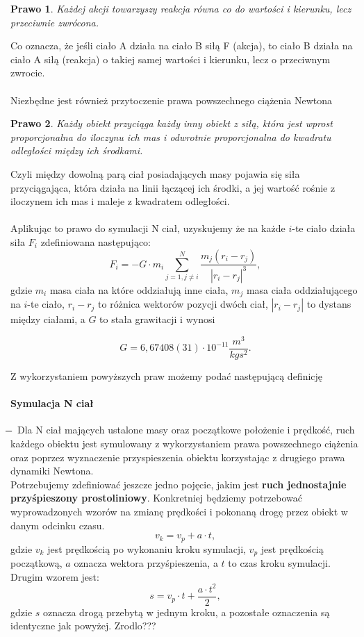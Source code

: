 \documentclass[14pt,twoside,a4paper]{article}
\newtheorem{theorem}{Prawo}
\begin{document}
\begin{theorem}
Każdej akcji towarzyszy reakcja równa co do wartości i kierunku, lecz przeciwnie zwrócona.
\end{theorem} 
Co oznacza, że jeśli ciało A działa na ciało B siłą F (akcja), to ciało B działa na ciało A siłą (reakcja) o takiej samej wartości i kierunku, lecz o przeciwnym zwrocie.\\~\\


Niezbędne jest również przytoczenie prawa powszechnego ciążenia Newtona \cite{fund}
\begin{theorem}
Każdy obiekt przyciąga każdy inny obiekt z siłą, która jest wprost proporcjonalna do iloczynu ich mas i odwrotnie proporcjonalna do kwadratu odległości między ich środkami.
\end{theorem}
Czyli między dowolną parą ciał posiadających masy pojawia się siła przyciągająca, która działa na linii łączącej ich środki, a jej wartość rośnie z iloczynem ich mas i maleje z kwadratem odległości.\\~\\

Aplikując to prawo do symulacji N ciał, uzyskujemy że na każde $i$-te ciało działa siła $F_i$ zdefiniowana następująco:\\
$$F_i = -G\cdot m_i \sum_{j=1, j\neq i}^N \frac{m_j(r_i - r_j)}{|r_i - r_j|^3},$$gdzie $m_i$ masa ciała na które oddziałują inne ciała, $m_j$ masa ciała oddziałującego na $i$-te ciało, $r_i - r_j$ to różnica wektorów pozycji dwóch ciał, $|r_i - r_j|$ to dystans między ciałami, a $G$ to stała grawitacji i wynosi
\begin{center}
$$G = 6,67408(31)\cdot 10^{-11} \frac{m^{3}}{kg s^2}.$$
\end{center}
Z wykorzystaniem powyższych praw możemy podać następującą definicję
\paragraph{Symulacja N ciał} 
\newcommand{\mi}{\boldsymbol{} \mathrel{\mkern -16mu} \boldsymbol{-}}
$\mi$
Dla N ciał mających ustalone masy oraz początkowe położenie i prędkość, ruch każdego obiektu jest symulowany z wykorzystaniem prawa powszechnego ciążenia oraz poprzez wyznaczenie przyspieszenia obiektu korzystając z drugiego prawa dynamiki Newtona.\\
\bigskip
Potrzebujemy zdefiniować jeszcze jedno pojęcie, jakim jest \textbf{ruch jednostajnie przyśpieszony prostoliniowy}.
Konkretniej będziemy potrzebować wyprowadzonych wzorów na zmianę prędkości i pokonaną drogę przez obiekt w danym odcinku czasu.
$$v_k = v_p + a\cdot t,$$ gdzie $v_k$ jest prędkością po wykonaniu kroku symulacji, $v_p$ jest prędkością początkową, $a$ oznacza wektora przyśpieszenia, a $t$ to czas kroku symulacji.\\
Drugim wzorem jest:
$$s = v_p\cdot t + \frac{a\cdot t^2}{2},$$ gdzie $s$ oznacza drogą przebytą w jednym kroku, a pozostałe oznaczenia są identyczne jak powyżej. Zrodlo??? \\
\end{document}

